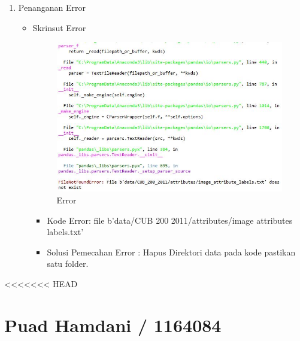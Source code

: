 \begin{enumerate}
\item Penanganan Error
\begin{itemize}
\item Skrinsut Error
\par
\begin{figure}[ht]
\centering
\includegraphics[scale=0.7]{figures/hmm/errorr.jpg}
\caption{Error}
\label{contoh}
\end{figure}
\par
\begin{itemize}
\item Kode Error: file b'data/CUB 200 2011/attributes/image attributes labels.txt'
\par 
\item Solusi Pemecahan Error : Hapus Direktori data pada kode pastikan satu folder.
\par 
\par
\end{itemize}
\end{itemize}

\end{enumerate}

<<<<<<< HEAD

\section {Puad Hamdani / 1164084}
